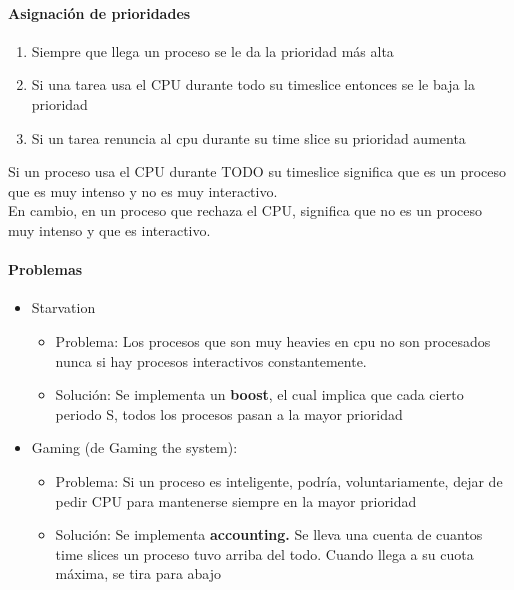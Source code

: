\documentclass{article}
\begin{document}
\paragraph{Asignación de
prioridades}\label{asignaciuxf3n-de-prioridades}

\begin{enumerate}
\def\labelenumi{\arabic{enumi}.}
\item
  Siempre que llega un proceso se le da la prioridad más alta
\item
  Si una tarea usa el CPU durante todo su timeslice entonces se le baja
  la prioridad
\item
  Si un tarea renuncia al cpu durante su time slice su prioridad aumenta
\end{enumerate}

Si un proceso usa el CPU durante TODO su timeslice significa que es un
proceso que es muy intenso y no es muy interactivo.\\
En cambio, en un proceso que rechaza el CPU, significa que no es un
proceso muy intenso y que es interactivo.

\paragraph{Problemas}\label{problemas}

\begin{itemize}
\item
  Starvation

  \begin{itemize}
  \item
    Problema: Los procesos que son muy heavies en cpu no son procesados
    nunca si hay procesos interactivos constantemente.
  \item
    Solución: Se implementa un \textbf{boost}, el cual implica que cada
    cierto periodo S, todos los procesos pasan a la mayor prioridad
  \end{itemize}
\item
  Gaming (de Gaming the system):

  \begin{itemize}
  \item
    Problema: Si un proceso es inteligente, podría, voluntariamente,
    dejar de pedir CPU para mantenerse siempre en la mayor prioridad
  \item
    Solución: Se implementa \textbf{accounting.} Se lleva una cuenta de
    cuantos time slices un proceso tuvo arriba del todo. Cuando llega a
    su cuota máxima, se tira para abajo
  \end{itemize}
\end{itemize}
\end{document}
